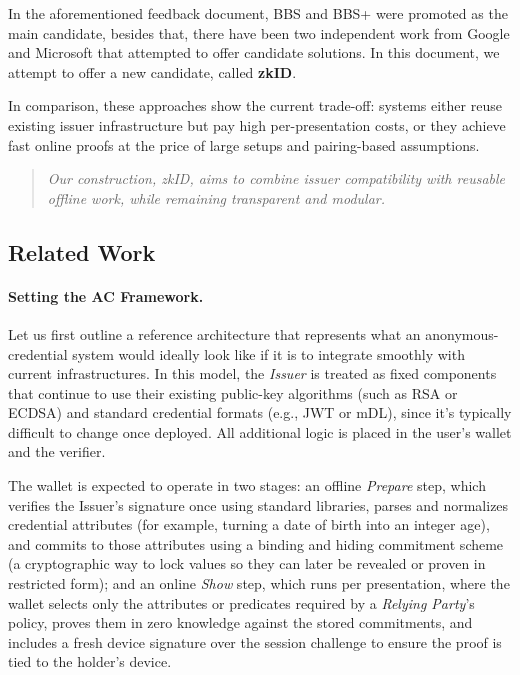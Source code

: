 In the aforementioned feedback document, BBS and BBS+
were promoted as the main candidate, besides that, there have been two independent work from Google and Microsoft that attempted to offer candidate solutions. In this document, we attempt to offer a new candidate, called \textbf{zkID}.

In comparison, these approaches show the current trade-off: systems either reuse existing issuer infrastructure but pay high per-presentation costs, or they achieve fast online proofs at the price of large setups and pairing-based assumptions. 
\begin{quote}
	\emph{Our construction, zkID, aims to combine issuer compatibility with reusable offline work, while remaining transparent and modular.}
\end{quote}


\subsection{Related Work}
\paragraph{Setting the AC Framework.}
Let us first outline a reference architecture that represents what an anonymous-credential system would ideally look like if it is to integrate smoothly with current infrastructures. 
In this model, the \emph{Issuer} is treated as fixed components that continue to use their existing public-key algorithms (such as RSA or ECDSA) and standard credential formats (e.g., JWT or mDL), since it's typically difficult to change once deployed. All additional logic is placed in the user’s wallet and the verifier.

The wallet is expected to operate in two stages: an offline \emph{Prepare} step, which verifies the Issuer’s signature once using standard libraries, parses and normalizes credential attributes (for example, turning a date of birth into an integer age), and commits to those attributes using a binding and hiding commitment scheme (a cryptographic way to lock values so they can later be revealed or proven in restricted form); and an online \emph{Show} step, which runs per presentation, where the wallet selects only the attributes or predicates required by a \emph{Relying Party}’s policy, proves them in zero knowledge against the stored commitments, and includes a fresh device signature over the session challenge to ensure the proof is tied to the holder’s device.

